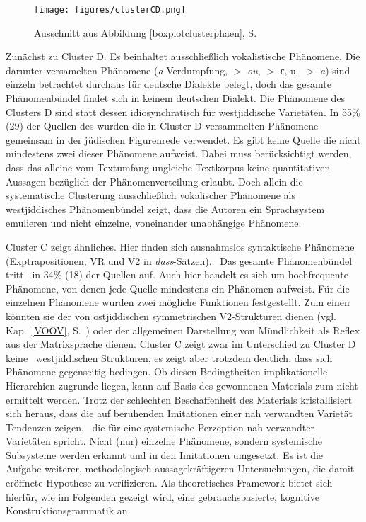  \begin{figure}
\centering
\texttt{[image: figures/clusterCD.png]}
		\caption{\label{clusterCD} Ausschnitt aus Abbildung \ref{boxplotclusterphaen}, S.\, \pageref{boxplotclusterphaen}}
	\end{figure}
 

Zunächst zu Cluster D. Es beinhaltet ausschließlich vokalistische Phänomene. Die darunter versamelten Phänomene (\textit{a}-Verdumpfung,  $>$ \textit{ou},  $>$ ɛ\textsubarch{\textsci},   u.\, $>$ \textit{a\textlengthmark}) sind einzeln betrachtet durchaus für deutsche Dialekte belegt, doch das gesamte Phänomenbündel findet sich in keinem deutschen Dialekt. Die Phänomene des Clusters D  sind statt dessen idiosynchratisch für westjiddische Varietäten. In 55\% (29) der Quellen des  wurden die in Cluster D versammelten Phänomene gemeinsam in der jüdischen Figurenrede verwendet. Es gibt keine Quelle die nicht mindestens zwei dieser Phänomene aufweist. Dabei muss berücksichtigt werden, dass das alleine vom Textumfang ungleiche Textkorpus keine quantitativen Aussagen bezüglich der Phänomenverteilung erlaubt. Doch allein die systematische Clusterung ausschließlich vokalischer Phänomene als  \,%
 westjiddisches Phänomenbündel zeigt, dass die Autoren ein Sprachsystem emulieren und nicht einzelne, voneinander unabhängige Phänomene.

Cluster C zeigt ähnliches. Hier finden sich ausnahmslos syntaktische Phänomene (Exptrapositionen, VR und V2 in \textit{dass}-Sätzen). \,%
 Das gesamte Phänomenbündel tritt \,%
 in 34\% (18) der Quellen auf. Auch hier handelt es sich um hochfrequente Phänomene, von denen jede Quelle mindestens ein Phänomen aufweist. Für die einzelnen Phänomene wurden zwei mögliche Funktionen festgestellt. Zum einen könnten sie der  von ostjiddischen symmetrischen V2-Strukturen dienen (vgl.\, Kap.\, \ref{VOOV}, S.\, \pageref{VOOV}) oder der allgemeinen Darstellung von Mündlichkeit als Reflex aus der Matrixsprache dienen. Cluster C zeigt zwar im Unterschied zu Cluster D keine  \,%
  westjiddischen Strukturen, es zeigt aber trotzdem deutlich, dass sich Phänomene gegenseitig bedingen. Ob diesen Bedingtheiten implikationelle Hierarchien zugrunde liegen, kann auf Basis des gewonnenen Materials zum \hai{{\LiJi}} nicht ermittelt werden. Trotz der schlechten Beschaffenheit des Materials kristallisiert sich heraus, dass die auf  beruhenden Imitationen einer nah verwandten Varietät Tendenzen zeigen, \,%
  die für eine systemische Perzeption nah verwandter \,%
  Varietäten spricht. Nicht (nur) einzelne Phänomene, sondern systemische Subsysteme werden erkannt und in den Imitationen umgesetzt. Es ist die Aufgabe weiterer, methodologisch aussagekräftigeren Untersuchungen, die damit eröffnete Hypothese zu verifizieren. Als theoretisches Framework bietet sich hierfür, wie im Folgenden gezeigt wird, eine gebrauchsbasierte, kognitive Konstruktionsgrammatik an.  
  
